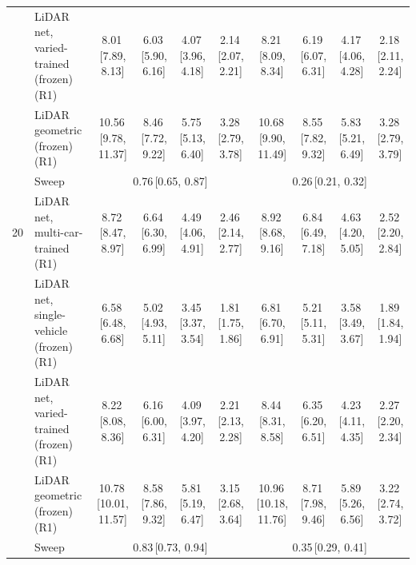 \begin{table}[t]
{\begin{tabular}{@{}llcccccccc@{}}
 & LiDAR net, varied-trained (frozen) (R1) & 8.01\,[7.89, 8.13] & 6.03\,[5.90, 6.16] & 4.07\,[3.96, 4.18] & 2.14\,[2.07, 2.21] & 8.21\,[8.09, 8.34] & 6.19\,[6.07, 6.31] & 4.17\,[4.06, 4.28] & 2.18\,[2.11, 2.24] \\
 & LiDAR geometric (frozen) (R1) & 10.56\,[9.78, 11.37] & 8.46\,[7.72, 9.22] & 5.75\,[5.13, 6.40] & 3.28\,[2.79, 3.78] & 10.68\,[9.90, 11.49] & 8.55\,[7.82, 9.32] & 5.83\,[5.21, 6.49] & 3.28\,[2.79, 3.79] \\
 & Sweep & \multicolumn{4}{c}{0.76\,[0.65, 0.87]} & \multicolumn{4}{c}{0.26\,[0.21, 0.32]} \\
\midrule
20 & LiDAR net, multi-car-trained (R1) & 8.72\,[8.47, 8.97] & 6.64\,[6.30, 6.99] & 4.49\,[4.06, 4.91] & 2.46\,[2.14, 2.77] & 8.92\,[8.68, 9.16] & 6.84\,[6.49, 7.18] & 4.63\,[4.20, 5.05] & 2.52\,[2.20, 2.84] \\
 & LiDAR net, single-vehicle (frozen) (R1) & 6.58\,[6.48, 6.68] & 5.02\,[4.93, 5.11] & 3.45\,[3.37, 3.54] & 1.81\,[1.75, 1.86] & 6.81\,[6.70, 6.91] & 5.21\,[5.11, 5.31] & 3.58\,[3.49, 3.67] & 1.89\,[1.84, 1.94] \\
 & LiDAR net, varied-trained (frozen) (R1) & 8.22\,[8.08, 8.36] & 6.16\,[6.00, 6.31] & 4.09\,[3.97, 4.20] & 2.21\,[2.13, 2.28] & 8.44\,[8.31, 8.58] & 6.35\,[6.20, 6.51] & 4.23\,[4.11, 4.35] & 2.27\,[2.20, 2.34] \\
 & LiDAR geometric (frozen) (R1) & 10.78\,[10.01, 11.57] & 8.58\,[7.86, 9.32] & 5.81\,[5.19, 6.47] & 3.15\,[2.68, 3.64] & 10.96\,[10.18, 11.76] & 8.71\,[7.98, 9.46] & 5.89\,[5.26, 6.56] & 3.22\,[2.74, 3.72] \\
 & Sweep & \multicolumn{4}{c}{0.83\,[0.73, 0.94]} & \multicolumn{4}{c}{0.35\,[0.29, 0.41]} \\
\bottomrule\end{tabular}}\end{table}
